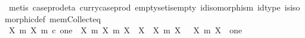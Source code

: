 \begin{isabellebody}
\ {\isacharparenleft}{\kern0pt}metis\ case{\isacharunderscore}{\kern0pt}prod{\isacharunderscore}{\kern0pt}eta\ curry{\isacharunderscore}{\kern0pt}case{\isacharunderscore}{\kern0pt}prod\ emptyset{\isacharunderscore}{\kern0pt}is{\isacharunderscore}{\kern0pt}empty\ id{\isacharunderscore}{\kern0pt}isomorphism\ id{\isacharunderscore}{\kern0pt}type\ is{\isacharunderscore}{\kern0pt}isomorphic{\isacharunderscore}{\kern0pt}def\ mem{\isacharunderscore}{\kern0pt}Collect{\isacharunderscore}{\kern0pt}eq{\isacharparenright}{\kern0pt}\isanewline
\isanewline
\ \ \isamarkupfalse%
\ {\isachardoublequoteopen}{\isacharbraceleft}{\kern0pt}{\isacharparenleft}{\kern0pt}X{\isacharcomma}{\kern0pt}\ m{\isacharparenright}{\kern0pt}{\isachardot}{\kern0pt}\ {\isacharparenleft}{\kern0pt}X{\isacharcomma}{\kern0pt}\ m{\isacharparenright}{\kern0pt}\ {\isasymsubseteq}\isactrlsub c\ one{\isacharbraceright}{\kern0pt}\ {\isacharslash}{\kern0pt}{\isacharslash}{\kern0pt}\ {\isacharbraceleft}{\kern0pt}{\isacharparenleft}{\kern0pt}{\isacharparenleft}{\kern0pt}X{}{\isacharcomma}{\kern0pt}\ m{}{\isacharparenright}{\kern0pt}{\isacharcomma}{\kern0pt}\ {\isacharparenleft}{\kern0pt}X{}{\isacharcomma}{\kern0pt}\ m{}{\isacharparenright}{\kern0pt}{\isacharparenright}{\kern0pt}{\isachardot}{\kern0pt}\ X{}\ {\isasymcong}\ X{}{\isacharbraceright}{\kern0pt}\ {\isacharequal}{\kern0pt}\ {\isacharbraceleft}{\kern0pt}{\isacharbraceleft}{\kern0pt}{\isacharparenleft}{\kern0pt}X{\isacharcomma}{\kern0pt}\ m{\isacharparenright}{\kern0pt}{\isachardot}{\kern0pt}\ X\ {\isasymcong}\ {\isasymemptyset}{\isacharbraceright}{\kern0pt}{\isacharcomma}{\kern0pt}\ {\isacharbraceleft}{\kern0pt}{\isacharparenleft}{\kern0pt}X{\isacharcomma}{\kern0pt}\ m{\isacharparenright}{\kern0pt}{\isachardot}{\kern0pt}\ X\ {\isasymcong}\ one{\isacharbraceright}{\kern0pt}{\isacharbraceright}{\kern0pt}{\isachardoublequoteclose}\isanewline
\ \ \isamarkupfalse%
\isanewline
\ \ \ \ \isamarkupfalse%

\end{isabellebody}
